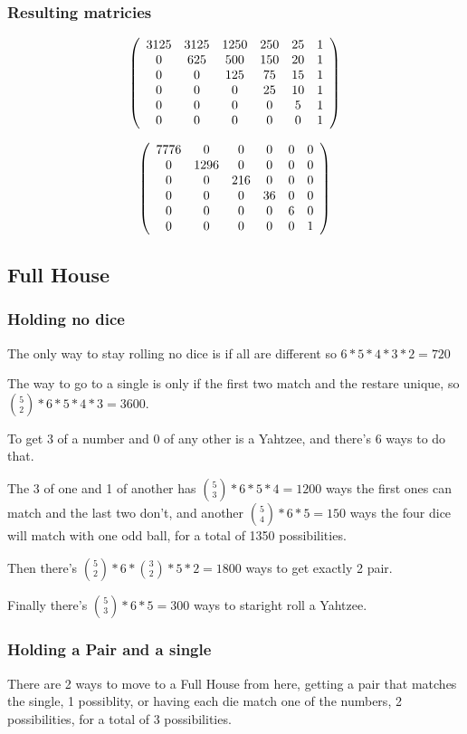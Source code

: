 \subsubsection{Resulting matricies}
\[
\left(
\begin{array}{c c c c c c}
3125 & 3125 & 1250 & 250 & 25 & 1\\
0 & 625 & 500 & 150 & 20 & 1\\
0 & 0 & 125 & 75 & 15 & 1\\
0 & 0 & 0 & 25 & 10 & 1\\
0 & 0 & 0 & 0 & 5 & 1\\
0 & 0 & 0 & 0 & 0 & 1
\end{array}
\right)
\]

\[
\left(
\begin{array}{c c c c c c}
7776 &0&0&0&0&0\\
0 & 1296&0&0&0&0\\
0 &0&216&0&0&0\\
0 &0&0&36&0&0\\
0 &0&0&0&6&0\\
0&0&0&0&0&1
\end{array}
\right)
\]

\subsection{Full House}

\subsubsection{Holding no dice}
The only way to stay rolling no dice is if all are different so $6*5*4*3*2=720$

The way to go to a single is only if the first two match and the restare unique, so ${5 \choose 2}*6*5*4*3=3600$.

To get 3 of a number and 0 of any other is a Yahtzee, and there's 6 ways to do that. 

The 3 of one and 1 of another has ${5 \choose 3}*6*5*4 = 1200 $ ways the first ones can match and the last two don't, and another ${5 \choose 4}*6*5=150$ ways the four dice will match with one odd ball, for a total of 1350 possibilities. 

Then there's ${5 \choose 2}*6*{3 \choose 2}*5*2 = 1800$ ways to get exactly 2 pair. 

Finally there's ${5 \choose 3}*6*5 =300$ ways to staright roll a Yahtzee. 

\subsubsection{Holding a Pair and a single}
There are 2 ways to move to a Full House from here, getting a pair that matches the single, 1 possiblity, or having each die match one of the numbers, 2 possibilities, for a total of 3 possibilities.

